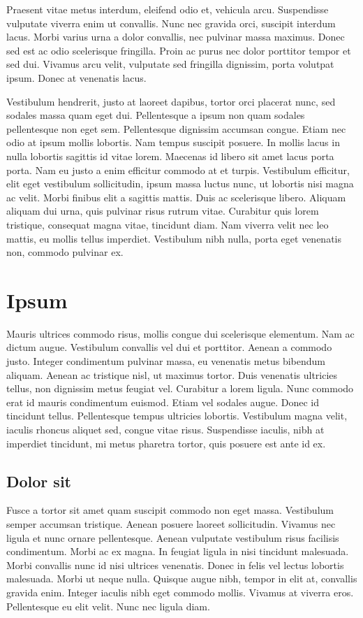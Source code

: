 Praesent vitae metus interdum, eleifend odio et, vehicula arcu. Suspendisse vulputate viverra enim ut convallis. Nunc nec gravida orci, suscipit interdum lacus. Morbi varius urna a dolor convallis, nec pulvinar massa maximus. Donec sed est ac odio scelerisque fringilla. Proin ac purus nec dolor porttitor tempor et sed dui. Vivamus arcu velit, vulputate sed fringilla dignissim, porta volutpat ipsum. Donec at venenatis lacus.

Vestibulum hendrerit, justo at laoreet dapibus, tortor orci placerat nunc, sed sodales massa quam eget dui. Pellentesque a ipsum non quam sodales pellentesque non eget sem. Pellentesque dignissim accumsan congue. Etiam nec odio at ipsum mollis lobortis. Nam tempus suscipit posuere. In mollis lacus in nulla lobortis sagittis id vitae lorem. Maecenas id libero sit amet lacus porta porta. Nam eu justo a enim efficitur commodo at et turpis. Vestibulum efficitur, elit eget vestibulum sollicitudin, ipsum massa luctus nunc, ut lobortis nisi magna ac velit. Morbi finibus elit a sagittis mattis. Duis ac scelerisque libero. Aliquam aliquam dui urna, quis pulvinar risus rutrum vitae. Curabitur quis lorem tristique, consequat magna vitae, tincidunt diam. Nam viverra velit nec leo mattis, eu mollis tellus imperdiet. Vestibulum nibh nulla, porta eget venenatis non, commodo pulvinar ex.

\section{Ipsum}
\label{sec:ipsum}
Mauris ultrices commodo risus, mollis congue dui scelerisque elementum. Nam ac dictum augue. Vestibulum convallis vel dui et porttitor. Aenean a commodo justo. Integer condimentum pulvinar massa, eu venenatis metus bibendum aliquam. Aenean ac tristique nisl, ut maximus tortor. Duis venenatis ultricies tellus, non dignissim metus feugiat vel. Curabitur a lorem ligula. Nunc commodo erat id mauris condimentum euismod. Etiam vel sodales augue. Donec id tincidunt tellus. Pellentesque tempus ultricies lobortis. Vestibulum magna velit, iaculis rhoncus aliquet sed, congue vitae risus. Suspendisse iaculis, nibh at imperdiet tincidunt, mi metus pharetra tortor, quis posuere est ante id ex.

\subsection{Dolor sit} %
\label{sub:dolor_sit}
Fusce a tortor sit amet quam suscipit commodo non eget massa. Vestibulum semper accumsan tristique. Aenean posuere laoreet sollicitudin. Vivamus nec ligula et nunc ornare pellentesque. Aenean vulputate vestibulum risus facilisis condimentum. Morbi ac ex magna. In feugiat ligula in nisi tincidunt malesuada. Morbi convallis nunc id nisi ultrices venenatis. Donec in felis vel lectus lobortis malesuada. Morbi ut neque nulla. Quisque augue nibh, tempor in elit at, convallis gravida enim. Integer iaculis nibh eget commodo mollis. Vivamus at viverra eros. Pellentesque eu elit velit. Nunc nec ligula diam.

